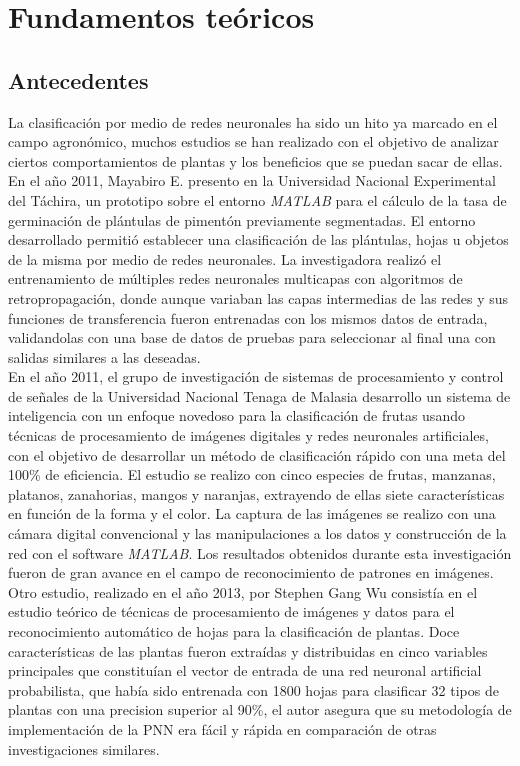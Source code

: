 \chapter{Fundamentos te\'oricos}

\section{Antecedentes}

La clasificación por medio de redes neuronales ha sido un hito ya marcado en el campo agronómico, muchos estudios se han realizado con el objetivo de analizar ciertos comportamientos de plantas y los beneficios que se puedan sacar de ellas. En el año 2011, Mayabiro E. presento en la Universidad Nacional Experimental del Táchira, un prototipo sobre el entorno \textit{MATLAB} para el cálculo de la tasa de germinación de plántulas de pimentón previamente segmentadas. El entorno desarrollado permitió establecer una clasificación de las plántulas, hojas u objetos de la misma por medio de redes neuronales. La investigadora realizó el entrenamiento de múltiples redes neuronales multicapas con algoritmos de retropropagación, donde aunque variaban las capas intermedias de las redes y sus funciones de transferencia fueron entrenadas con los mismos  datos de entrada, validandolas con una base de datos de pruebas para seleccionar al final una con salidas similares a las deseadas.\\

En el año 2011, el grupo de investigación de sistemas de procesamiento y control de señales de la Universidad Nacional Tenaga de Malasia desarrollo un sistema de inteligencia con un enfoque novedoso para la clasificación de frutas usando técnicas de procesamiento de imágenes digitales y redes neuronales artificiales, con el objetivo de desarrollar un método de clasificación rápido con una meta del 100\% de eficiencia. El estudio se realizo con cinco especies de frutas, manzanas, platanos, zanahorias, mangos y naranjas, extrayendo de ellas siete características en función de la forma y el color. La captura de las imágenes se realizo con una cámara digital convencional y las manipulaciones a los datos y construcción de la red con el software \textit{MATLAB}. Los resultados obtenidos durante esta investigación fueron de gran avance en el campo de reconocimiento de patrones en imágenes.\\

Otro estudio, realizado en el año 2013,  por Stephen Gang Wu consistía en el estudio teórico de técnicas de procesamiento de imágenes y datos para el reconocimiento automático de hojas para la clasificación de plantas. Doce características de las plantas fueron extraídas y distribuidas en cinco variables principales que constituían el vector de entrada de una red neuronal artificial probabilista, que había sido entrenada con 1800 hojas para clasificar 32 tipos de plantas con una precision superior al 90\%, el autor asegura que su metodología de implementación de la PNN era fácil y rápida en comparación de otras investigaciones similares.\\

